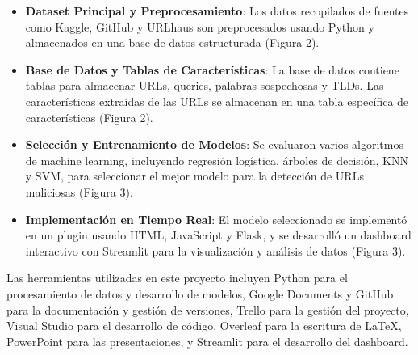 \begin{itemize}
    \item \textbf{Dataset Principal y Preprocesamiento}: 
    Los datos recopilados de fuentes como Kaggle, GitHub y URLhaus son preprocesados usando Python y almacenados en una base de datos estructurada (Figura 2).
    
    \item \textbf{Base de Datos y Tablas de Características}: 
    La base de datos contiene tablas para almacenar URLs, queries, palabras sospechosas y TLDs. Las características extraídas de las URLs se almacenan en una tabla específica de características (Figura 2).
    
    \item \textbf{Selección y Entrenamiento de Modelos}: 
    Se evaluaron varios algoritmos de machine learning, incluyendo regresión logística, árboles de decisión, KNN y SVM, para seleccionar el mejor modelo para la detección de URLs maliciosas (Figura 3).
    
    \item \textbf{Implementación en Tiempo Real}: 
    El modelo seleccionado se implementó en un plugin usando HTML, JavaScript y Flask, y se desarrolló un dashboard interactivo con Streamlit para la visualización y análisis de datos (Figura 3).
\end{itemize}

Las herramientas utilizadas en este proyecto incluyen Python para el procesamiento de datos y desarrollo de modelos, Google Documents y GitHub para la documentación y gestión de versiones, Trello para la gestión del proyecto, Visual Studio para el desarrollo de código, Overleaf para la escritura de LaTeX, PowerPoint para las presentaciones, y Streamlit para el desarrollo del dashboard.



